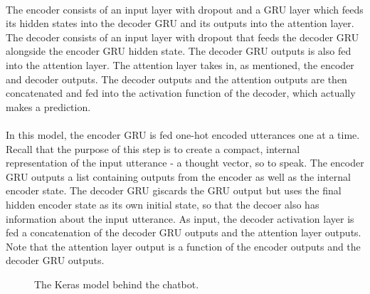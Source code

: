 \documentclass{article}
\begin{document}
\paragraph{}
The encoder consists of an input layer with dropout and a GRU
layer which feeds its hidden states into the decoder GRU and its outputs into 
the attention layer. The decoder consists of an input layer with dropout that
feeds the decoder GRU alongside the encoder GRU hidden state. The decoder GRU
outputs is also fed into the attention layer. The attention layer takes in, as
mentioned, the encoder and decoder outputs. The decoder outputs and the
attention outputs are then concatenated and fed into the activation function of
the decoder, which actually makes a prediction.

\paragraph{}
In this model, the encoder GRU is fed one-hot encoded utterances one at a
time. Recall that the purpose of this step is to create a compact, internal
representation of the input utterance - a thought vector, so to speak. The
encoder GRU outputs a list containing outputs from the encoder as well as the
internal encoder state. The decoder GRU giscards the GRU output but uses the
final hidden encoder state as its own initial state, so that the decoer also
has information about the input utterance. As input, the decoder activation
layer is fed a concatenation of the decoder GRU outputs and the attention layer
outputs. Note that the attention layer output is a function of the encoder
outputs and the decoder GRU outputs. 

\begin{center}
  \begin{figure}[hbt]
    \centering
    \caption{The Keras model behind the chatbot.}
    \label{fig:keras-model}
  \end{figure}
\end{center}
\end{document}
